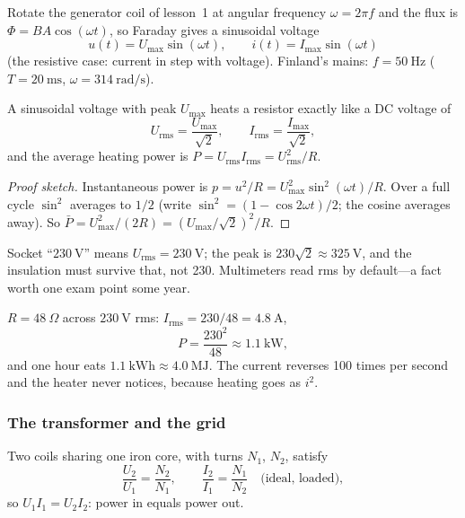 Rotate the generator coil of lesson~1 at angular frequency $\omega = 2\pi f$ and the flux is $\Phi = BA\cos(\omega t)$, so Faraday gives a sinusoidal voltage
\begin{equation}\label{eq:ac}
  u(t) = U_\text{max}\sin(\omega t), \qquad i(t) = I_\text{max}\sin(\omega t)
\end{equation}
(the resistive case: current in step with voltage). Finland's mains: $f = 50\ \mathrm{Hz}$ ($T = 20\ \mathrm{ms}$, $\omega = 314\ \mathrm{rad/s}$).

\begin{proposition}\label{prop:rms}
A sinusoidal voltage with peak $U_\text{max}$ heats a resistor exactly like a DC voltage of
\begin{equation}\label{eq:rms}
  U_\text{rms} = \frac{U_\text{max}}{\sqrt{2}}, \qquad I_\text{rms} = \frac{I_\text{max}}{\sqrt{2}},
\end{equation}
and the average heating power is $P = U_\text{rms} I_\text{rms} = U_\text{rms}^2/R$.
\end{proposition}

\begin{proof}[Proof sketch]
Instantaneous power is $p = u^2/R = U_\text{max}^2\sin^2(\omega t)/R$. Over a full cycle $\sin^2$ averages to $1/2$ (write $\sin^2 = (1 - \cos 2\omega t)/2$; the cosine averages away). So $\bar{P} = U_\text{max}^2/(2R) = (U_\text{max}/\sqrt{2})^2/R$. \qedhere
\end{proof}

Socket ``$230\ \mathrm{V}$'' means $U_\text{rms} = 230\ \mathrm{V}$; the peak is $230\sqrt{2} \approx 325\ \mathrm{V}$, and the insulation must survive that, not 230. Multimeters read rms by default---a fact worth one exam point some year.

\begin{example}\label{exm:heater}
$R = 48\ \Omega$ across $230\ \mathrm{V}$ rms: $I_\text{rms} = 230/48 = 4.8\ \mathrm{A}$,
\[
  P = \frac{230^2}{48} \approx 1.1\ \mathrm{kW},
\]
and one hour eats $1.1\ \mathrm{kWh}\approx 4.0\ \mathrm{MJ}$. The current reverses 100 times per second and the heater never notices, because heating goes as $i^2$.
\end{example}

\subsubsection{The transformer and the grid}

\begin{proposition}\label{prop:transformer}
Two coils sharing one iron core, with turns $N_1$, $N_2$, satisfy
\begin{equation}\label{eq:transformer}
  \frac{U_2}{U_1} = \frac{N_2}{N_1}, \qquad \frac{I_2}{I_1} = \frac{N_1}{N_2}\quad\text{(ideal, loaded)},
\end{equation}
so $U_1 I_1 = U_2 I_2$: power in equals power out.
\end{proposition}

